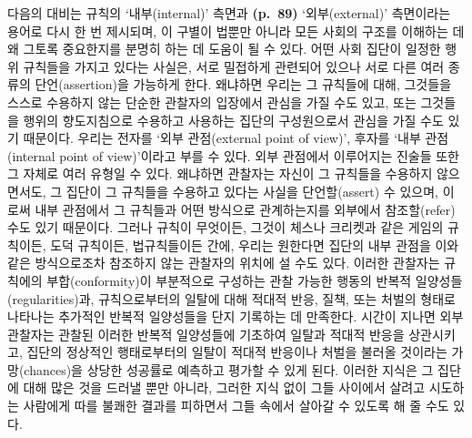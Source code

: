 다음의 대비는 규칙의 ‘내부(internal)’ 측면과 \textbf{(p.~89)}
‘외부(external)’ 측면이라는 용어로 다시 한 번 제시되며, 이 구별이 법뿐만
아니라 모든 사회의 구조를 이해하는 데 왜 그토록 중요한지를 분명히 하는
데 도움이 될 수 있다. 어떤 사회 집단이 일정한 행위 규칙들을 가지고
있다는 사실은, 서로 밀접하게 관련되어 있으나 서로 다른 여러 종류의
단언(assertion)을 가능하게 한다. 왜냐하면 우리는 그 규칙들에 대해,
그것들을 스스로 수용하지 않는 단순한 관찰자의 입장에서 관심을 가질 수도
있고, 또는 그것들을 행위의 향도지침으로 수용하고 사용하는 집단의
구성원으로서 관심을 가질 수도 있기 때문이다. 우리는 전자를 ‘외부
관점(external point of view)’, 후자를 ‘내부 관점(internal point of
view)’이라고 부를 수 있다. 외부 관점에서 이루어지는 진술들 또한 그
자체로 여러 유형일 수 있다. 왜냐하면 관찰자는 자신이 그 규칙들을
수용하지 않으면서도, 그 집단이 그 규칙들을 수용하고 있다는 사실을
단언할(assert) 수 있으며, 이로써  내부 관점에서 그
규칙들과 어떤 방식으로 관계하는지를 외부에서 참조할(refer) 수도 있기
때문이다. 그러나 규칙이 무엇이든, 그것이 체스나 크리켓과 같은 게임의
규칙이든, 도덕 규칙이든, 법규칙들이든 간에, 우리는 원한다면 집단의 내부
관점을 이와 같은 방식으로조차 참조하지 않는 관찰자의 위치에 설 수도
있다. 이러한 관찰자는 규칙에의 부합(conformity)이 부분적으로 구성하는
관찰 가능한 행동의 반복적 일양성들(regularities)과, 규칙으로부터의
일탈에 대해 적대적 반응, 질책, 또는 처벌의 형태로 나타나는 추가적인
반복적 일양성들을 단지 기록하는 데 만족한다. 시간이 지나면 외부 관찰자는
관찰된 이러한 반복적 일양성들에 기초하여 일탈과 적대적 반응을
상관시키고, 집단의 정상적인 행태로부터의 일탈이 적대적 반응이나 처벌을
불러올 것이라는 가망(chances)을 상당한 성공률로 예측하고 평가할 수 있게
된다. 이러한 지식은 그 집단에 대해 많은 것을 드러낼 뿐만 아니라, 그러한
지식 없이 그들 사이에서 살려고 시도하는 사람에게 따를 불쾌한 결과를
피하면서 그들 속에서 살아갈 수 있도록 해 줄 수도 있다.


